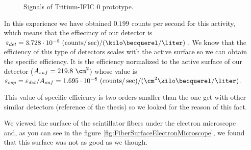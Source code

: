 \begin{figure}[htbp]
\centering
{}
\caption{Signals of Tritium-IFIC 0 prototype.} \label{fig:Tritium_IFIC_0_Signals}
\end{figure}

In this experience we have obtained $0.199$ counts per second for this activity, which means that the effiecincy of our detector is $ \varepsilon_{det} = 3.728 \cdot 10^{-6}~(\ce{counts}/\sec)/(\kilo\becquerel/\liter)$. We know that the efficiency of this type of detectors scales with the active surface so we can obtain the specific efficiency. It is the efficiency normalized to the active surface of our detector ($A_{suf} = 219.8~\cm^2$) whose value is $ \varepsilon_{esp} = \varepsilon_{det}/A_{suf} =  1.695 \cdot 10^{-8}~(\ce{counts}/\sec)/(\cm^2\kilo\becquerel/\liter)$. 

This value of specific efficiency is two orders smaller than the one get with other similar detectors (reference of the thesis) so we looked for the reason of this fact. 

We viewed the surface of the scintillator fibers under the electron microscope and, as you can see in the figure \ref{fig:FiberSurfaceElectronMicroscope}, we found that this surface was not as good as we though. 

